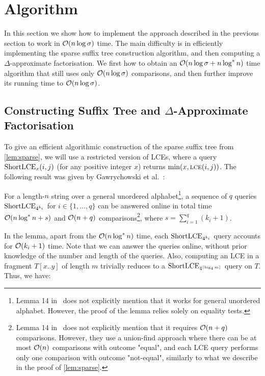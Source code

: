 \section{Algorithm}
\label{square:sec:alg}

In this section we show how to implement the approach described in the previous section
to work in $\mathcal{O}(n\log \sigma)$ time. The main
difficulty is in efficiently implementing the sparse suffix tree construction algorithm, and
then computing a $\Delta$-approximate factorisation. We first how to obtain an $\mathcal{O}(n\log \sigma+n\log^{*}n)$ time
algorithm that still uses only $\mathcal{O}(n\log \sigma)$ comparisons, and then further improve its running time to $\mathcal{O}(n\log \sigma)$.

\subsection[Constructing Suffix Tree and Delta-Approximate Factorisation]{Constructing Suffix Tree and \boldmath$\Delta$\unboldmath-Approximate Factorisation}
\label{sec:suffixtree}

To give an efficient algorithmic construction of the sparse suffix tree from \cref{lem:sparse}, we will use a restricted version of LCEs, where a query $\textnormal{ShortLCE}_x(i, j)$ (for any positive integer $x$) returns $\min(x, \textnormal{\textsc{lce}}(i, j))$. The following result was given by Gawrychowski et al.~\cite{Gawrychowski2016}:

\begin{lemma}
\label{lem:LCE_undordered_original}
For a length-$n$ string over a general unordered alphabet\footnote{Lemma 14 in~\cite{Gawrychowski2016} does not explicitly mention that it works for general unordered alphabet. However, the proof of the lemma relies solely on equality tests.}, a sequence of $q$ queries $\textnormal{ShortLCE}_{4^{k_i}}$ for $i \in \{1, \dots, q\}$ can be answered online in total time $\mathcal{O}(n \log^* n + s)$ and $\mathcal{O}(n + q)$ comparisons\footnote{Lemma 14 in~\cite{Gawrychowski2016} does not explicitly mention that it requires $\mathcal{O}(n + q)$ comparisons. However, they use a union-find approach where there can be at most $\mathcal{O}(n)$ comparisons with outcome "equal", and each LCE query performs only one comparison with outcome "not-equal", similarly to what we describe in the proof of \cref{lem:sparse}.}, where $s = \sum_{i = 1}^q(k_i + 1)$.
\end{lemma}

In the lemma, apart from the $\mathcal{O}(n \log^* n)$ time, each $\textnormal{ShortLCE}_{4^{k_i}}$ query accounts for $\mathcal{O}(k_i + 1)$ time. Note that we can answer the queries online, without prior knowledge of the number and length of the queries. Also, computing an LCE in a fragment $T[x..y]$ of length $m$ trivially reduces to a $\textnormal{ShortLCE}_{4^{\left\lceil\log_4 m\right\rceil}}$ query on $T$. Thus, we have:

